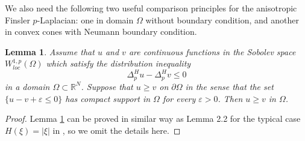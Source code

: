 \documentclass[12pt]{amsart}
\newtheorem{lem}[thm]{Lemma}
\theoremstyle{definition}
\theoremstyle{remark}
\theoremstyle{conclusion}
\theoremstyle{conjecture}
\numberwithin{equation}{section}
\begin{document}
We also need the following two useful comparison principles for the anisotropic Finsler $p$-Laplacian: one in domain $\Omega$ without boundary condition, and another in convex cones with Neumann boundary condition.
\begin{lem}\label{weak comparison1}
Assume that $u$ and $v$ are continuous functions in the Sobolev space $W^{1,p}_{loc}(\Omega)$ which satisfy the distribution inequality
 $$\Delta ^{H}_{p}u-\Delta ^{H}_{p}v \leq 0$$
in a domain $\Omega\subset\mathbb{R}^N$. Suppose that $u\geq v$ on $\partial\Omega$ in the sense that the set $\{u-v+\varepsilon\leq0\}$ has compact support in $\Omega$ for every $\varepsilon>0$. Then $u\geq v$ in $\Omega$.
\end{lem}
\begin{proof}
Lemma \ref{weak comparison1} can be proved in similar way as Lemma 2.2 for the typical case $H(\xi)=|\xi|$ in \cite{SZ}, so we omit the details here.
\end{proof}
\end{document}
